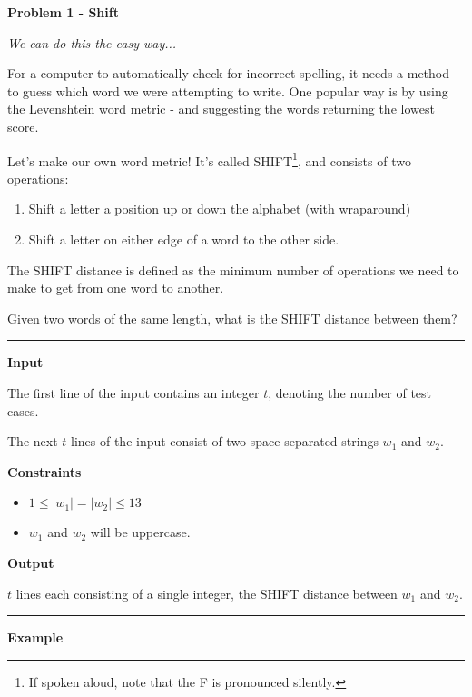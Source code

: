 \LARGE \textbf{Problem 1 - Shift} \normalsize

{\itshape We can do this the easy way...}

For a computer to  automatically check for incorrect spelling, 
it needs a method to guess which word we were attempting to write.
One popular way is by using the Levenshtein word metric - and suggesting the words returning the lowest score.

Let's make our own word metric! It's called SHIFT\footnote{If spoken aloud, note that the F is pronounced silently.}, and consists of two operations:

\begin{enumerate}
    \item Shift a letter a position up or down the alphabet (with wraparound)
    \item Shift a letter on either edge of a word to the other side.
\end{enumerate}

The SHIFT distance is defined as the minimum number of operations we need to make to get from one word to another.

Given two words of the same length, what is the SHIFT distance between them?

\vspace{8pt}
\hrule

\textbf{Input}

The first line of the input contains an integer $t$, denoting the number of test cases.

The next $t$ lines of the input consist of two space-separated strings $w_1$ and $w_2$.

\textbf{Constraints}

\begin{itemize}
    \item $1 \leq |w_1| = |w_2| \leq 13$
    \item $w_1$ and $w_2$ will be uppercase.
\end{itemize}

\textbf{Output}

$t$ lines each consisting of a single integer, the SHIFT distance between $w_1$ and $w_2$.

\vspace{8pt}
\hrule

\textbf{Example}

